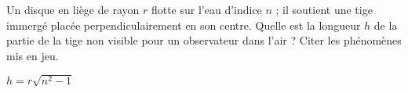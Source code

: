 \begin{Exercise}[title=Flotteur]
Un disque en liège de rayon $r$ flotte sur l’eau d’indice $n$ ; il soutient une tige  immergé placée perpendiculairement en son centre. Quelle est la longueur $h$ de la partie de la tige non visible pour un observateur dans l’air ?
Citer les phénomènes mis en jeu.
\end{Exercise}
\begin{Answer}
$h=r\sqrt{n^2-1}$
\end{Answer}
